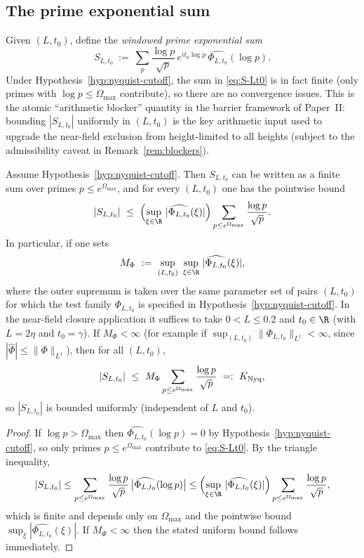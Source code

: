 \documentclass[11pt]{article}
\begin{document}
\subsection*{The prime exponential sum}
Given $(L,t_0)$, define the \emph{windowed prime exponential sum}
\begin{equation}\label{eq:S-Lt0}
  S_{L,t_0}\ :=\ \sum_{p} \frac{\log p}{\sqrt{p}}\,e^{it_0\log p}\,\widehat{\Phi_{L,t_0}}(\log p).
\end{equation}
Under Hypothesis~\ref{hyp:nyquist-cutoff}, the sum in \eqref{eq:S-Lt0} is in fact finite (only primes with $\log p\le \Omega_{\max}$ contribute), so there are no convergence issues.
This is the atomic ``arithmetic blocker'' quantity in the barrier framework of Paper~II: bounding $|S_{L,t_0}|$ uniformly in $(L,t_0)$ is the key arithmetic input used to upgrade the near-field exclusion from height-limited to all heights (subject to the admissibility caveat in Remark~\ref{rem:blockers}).

\begin{lemma}\label{lem:nyquist-implies-blocker}
Assume Hypothesis~\ref{hyp:nyquist-cutoff}.
Then $S_{L,t_0}$ can be written as a finite sum over primes $p\le e^{\Omega_{\max}}$, and for every $(L,t_0)$ one has the pointwise bound
\[
  |S_{L,t_0}|\ \le\
  \Bigl(\sup_{\xi\in\R}\,|\widehat{\Phi_{L,t_0}}(\xi)|\Bigr)
  \sum_{p\le e^{\Omega_{\max}}}\frac{\log p}{\sqrt{p}}.
\]
In particular, if one sets
\[
  M_\Phi\ :=\ \sup_{(L,t_0)}\ \sup_{\xi\in\R}\,|\widehat{\Phi_{L,t_0}}(\xi)|,
\]
where the outer supremum is taken over the same parameter set of pairs $(L,t_0)$ for which the test family $\Phi_{L,t_0}$ is specified in Hypothesis~\ref{hyp:nyquist-cutoff}.
In the near-field closure application it suffices to take $0<L\le 0.2$ and $t_0\in\R$ (with $L=2\eta$ and $t_0=\gamma$).
If $M_\Phi<\infty$ (for example if $\sup_{(L,t_0)}\|\Phi_{L,t_0}\|_{L^1}<\infty$, since $|\widehat{\Phi}|\le \|\Phi\|_{L^1}$),
then for all $(L,t_0)$,
\[
  |S_{L,t_0}|\ \le\ M_\Phi\sum_{p\le e^{\Omega_{\max}}}\frac{\log p}{\sqrt{p}}\ =:\ K_{\rm Nyq},
\]
so $|S_{L,t_0}|$ is bounded uniformly (independent of $L$ and $t_0$).
\end{lemma}
\begin{proof}
If $\log p>\Omega_{\max}$ then $\widehat{\Phi_{L,t_0}}(\log p)=0$ by Hypothesis~\ref{hyp:nyquist-cutoff}, so only primes $p\le e^{\Omega_{\max}}$ contribute to \eqref{eq:S-Lt0}.
By the triangle inequality,
\[
  |S_{L,t_0}|
  \le
  \sum_{p\le e^{\Omega_{\max}}}\frac{\log p}{\sqrt{p}}\,\bigl|\widehat{\Phi_{L,t_0}}(\log p)\bigr|
  \le
  \Bigl(\sup_{\xi\in\R}\,|\widehat{\Phi_{L,t_0}}(\xi)|\Bigr)\sum_{p\le e^{\Omega_{\max}}}\frac{\log p}{\sqrt{p}},
\]
which is finite and depends only on $\Omega_{\max}$ and the pointwise bound $\sup_{\xi}|\widehat{\Phi_{L,t_0}}(\xi)|$.
If $M_\Phi<\infty$ then the stated uniform bound follows immediately.
\end{proof}
\end{document}
